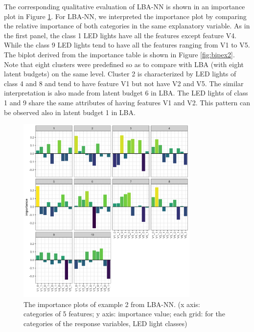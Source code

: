 \documentclass[]{interact}
\theoremstyle{plain}%
\theoremstyle{definition}
\theoremstyle{remark}
\begin{document}
The corresponding qualitative evaluation of LBA-NN is shown in an
importance plot in Figure \ref{fig:impex2}. For LBA-NN, we interpreted
the importance plot by comparing the relative importance of both
categories in the same explanatory variable. As in the first panel, the
class 1 LED lights have all the features except feature V4. While the
class 9 LED lights tend to have all the features ranging from V1 to V5.
The biplot derived from the importance table is shown in Figure
\ref{fig:bipex2}. Note that eight clusters were predefined so as to
compare with LBA (with eight latent budgets) on the same level. Cluster
2 is characterized by LED lights of class 4 and 8 and tend to have
feature V1 but not have V2 and V5. The similar interpretation is also
made from latent budget 6 in LBA. The LED lights of class 1 and 9 share
the same attributes of having features V1 and V2. This pattern can be
observed also in latent budget 1 in LBA.

\begin{figure}[H]
\centering
\includegraphics[width=0.8\textwidth]{figure/6_importance_plot_example_2.png}
\caption{The importance plots of example 2 from LBA-NN. (x axis: categories of 5 features; y axis: importance value; each grid: for the categories of the response variables, LED light classes) \label{fig:impex2}}
\end{figure}
\end{document}
